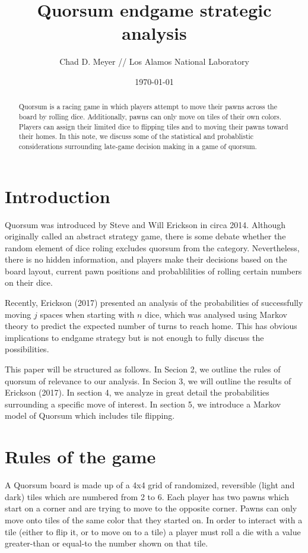 \documentclass[letterpaper]{article}
\begin{document}
\title{Quorsum endgame strategic analysis}
\author{Chad D. Meyer // Los Alamos National Laboratory}
\date{\today}
\maketitle

\begin{abstract}
Quorsum is a racing game in which players attempt to move their pawns across
the board by rolling dice.  Additionally, pawns can only move on tiles of
their own colors.  Players can assign their limited dice to flipping tiles
and to moving their pawns toward their homes.  In this note, we discuss some
of the statistical and probablistic considerations surrounding late-game
decision making in a game of quorsum.
\end{abstract}

\section{Introduction}
Quorsum was introduced by Steve and Will Erickson in circa 2014.  Although
originally called an abstract strategy game, there is some debate whether the
random element of dice roling excludes quorsum from the category.  Nevertheless,
there is no hidden information, and players make their decisions based on the
board layout, current pawn positions and probablilities of rolling certain
numbers on their dice.

Recently, Erickson (2017) presented an analysis of the probabilities of
successfully moving $j$ spaces when starting with $n$ dice, which was analysed
using Markov theory to predict the expected number of turns to reach home.  This
has obvious implications to endgame strategy but is not enough to fully discuss
the possibilities.

This paper will be structured as follows.  In Secion 2, we outline the rules of
quorsum of relevance to our analysis.  In Secion 3, we will outline the results
of Erickson (2017).  In section 4, we analyze in great detail the probabilities
surrounding a specific move of interest.  In section 5, we introduce a Markov
model of Quorsum which includes tile flipping. 

\section{Rules of the game}
A Quorsum board is made up of a 4x4 grid of randomized, reversible (light and
dark) tiles which are numbered from 2 to 6.  Each player has two pawns which
start on a corner and are trying to move to the opposite corner.  Pawns can only
move onto tiles of the same color that they started on.  In order to
interact with a tile (either to flip it, or to move on to a tile) a player must
roll a die with a value greater-than or equal-to the number shown on that tile.
\end{document}
